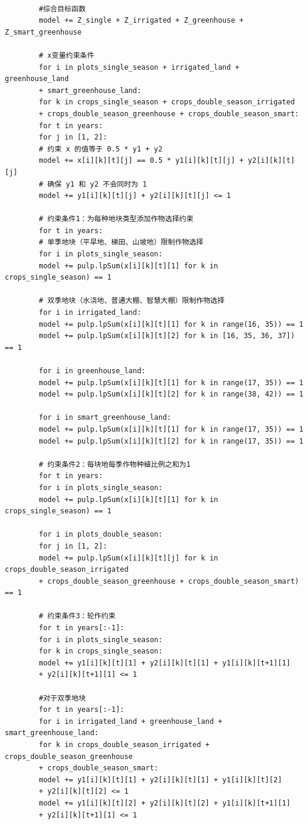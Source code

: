 \documentclass[12pt]{ctexart}
\begin{document}
\begin{verbatim}
		
		#综合目标函数
		model += Z_single + Z_irrigated + Z_greenhouse + Z_smart_greenhouse
		
		# x变量约束条件
		for i in plots_single_season + irrigated_land + greenhouse_land 
		+ smart_greenhouse_land:
		for k in crops_single_season + crops_double_season_irrigated
		+ crops_double_season_greenhouse + crops_double_season_smart:
		for t in years:
		for j in [1, 2]:
		# 约束 x 的值等于 0.5 * y1 + y2
		model += x[i][k][t][j] == 0.5 * y1[i][k][t][j] + y2[i][k][t][j]
		# 确保 y1 和 y2 不会同时为 1
		model += y1[i][k][t][j] + y2[i][k][t][j] <= 1
		
		# 约束条件1：为每种地块类型添加作物选择约束
		for t in years:
		# 单季地块（平旱地、梯田、山坡地）限制作物选择
		for i in plots_single_season:
		model += pulp.lpSum(x[i][k][t][1] for k in crops_single_season) == 1
		
		# 双季地块（水浇地、普通大棚、智慧大棚）限制作物选择
		for i in irrigated_land:
		model += pulp.lpSum(x[i][k][t][1] for k in range(16, 35)) == 1
		model += pulp.lpSum(x[i][k][t][2] for k in [16, 35, 36, 37]) == 1
		
		for i in greenhouse_land:
		model += pulp.lpSum(x[i][k][t][1] for k in range(17, 35)) == 1
		model += pulp.lpSum(x[i][k][t][2] for k in range(38, 42)) == 1
		
		for i in smart_greenhouse_land:
		model += pulp.lpSum(x[i][k][t][1] for k in range(17, 35)) == 1
		model += pulp.lpSum(x[i][k][t][2] for k in range(17, 35)) == 1
		
		# 约束条件2：每块地每季作物种植比例之和为1
		for t in years:
		for i in plots_single_season:
		model += pulp.lpSum(x[i][k][t][1] for k in crops_single_season) == 1
		
		for i in plots_double_season:
		for j in [1, 2]:
		model += pulp.lpSum(x[i][k][t][j] for k in crops_double_season_irrigated 
		+ crops_double_season_greenhouse + crops_double_season_smart) == 1
		
		# 约束条件3：轮作约束
		for t in years[:-1]: 
		for i in plots_single_season:
		for k in crops_single_season:
		model += y1[i][k][t][1] + y2[i][k][t][1] + y1[i][k][t+1][1]
		+ y2[i][k][t+1][1] <= 1
		
		#对于双季地块
		for t in years[:-1]: 
		for i in irrigated_land + greenhouse_land + smart_greenhouse_land:
		for k in crops_double_season_irrigated + crops_double_season_greenhouse
		+ crops_double_season_smart:
		model += y1[i][k][t][1] + y2[i][k][t][1] + y1[i][k][t][2] 
		+ y2[i][k][t][2] <= 1
		model += y1[i][k][t][2] + y2[i][k][t][2] + y1[i][k][t+1][1] 
		+ y2[i][k][t+1][1] <= 1
		

\end{verbatim}
\end{document}
